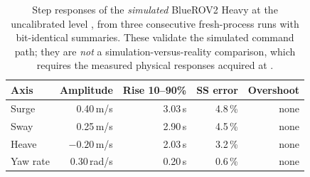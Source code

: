 \begin{table}[t]
\centering
\caption{Step responses of the \emph{simulated} BlueROV2 Heavy at the
uncalibrated level \SZERO{}, from three consecutive fresh-process runs with
bit-identical summaries. These validate the simulated command path; they are
\emph{not} a simulation-versus-reality comparison, which requires the
measured physical responses acquired at \STHREE{}.}
\label{tab:stepresponse}
\footnotesize
\setlength{\tabcolsep}{4pt}
\renewcommand{\arraystretch}{1.15}
\begin{tabular}{@{}l r r r r@{}}
\toprule
\textbf{Axis} & \textbf{Amplitude} & \textbf{Rise 10--90\%} &
\textbf{SS error} & \textbf{Overshoot} \\
\midrule
Surge    & 0.40\,m/s   & 3.03\,s & 4.8\,\% & none \\
Sway     & 0.25\,m/s   & 2.90\,s & 4.5\,\% & none \\
Heave    & $-0.20$\,m/s& 2.03\,s & 3.2\,\% & none \\
Yaw rate & 0.30\,rad/s & 0.20\,s & 0.6\,\% & none \\
\bottomrule
\end{tabular}
\end{table}
